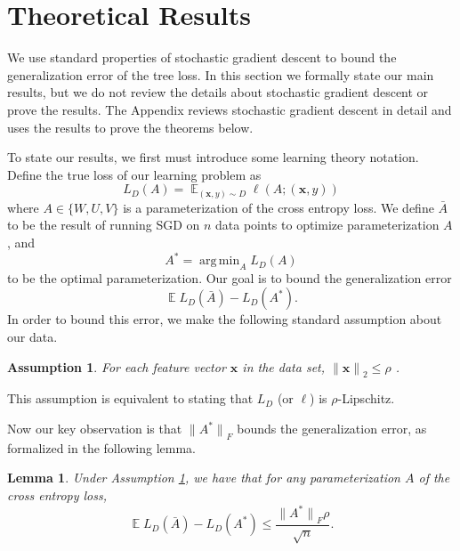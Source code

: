 \documentclass[twoside]{article}
\newtheorem{assumption}{Assumption}
\newtheorem{lemma}{Lemma}
\DeclareMathOperator{\E}{\mathbb E}
\DeclareMathOperator*{\argmin}{arg\,min}
\renewcommand{\star}[1]{{#1}^{*}}
\newcommand{\x}{\mathbf x}
\newcommand{\ltwo}[1]{{\lVert {#1} \rVert}_2}
\newcommand{\lF}[1]{{\lVert {#1} \rVert}_F}
\begin{document}

\section{Theoretical Results}
\label{sec:theory}

We use standard properties of stochastic gradient descent to bound the generalization error of the tree loss.
In this section we formally state our main results,
but we do not review the details about stochastic gradient descent or prove the results.
The Appendix reviews stochastic gradient descent in detail and uses the results to prove the theorems below.

To state our results, we first must introduce some learning theory notation.
Define the true loss of our learning problem as
\begin{equation}
    L_D(A) = \E_{(\x,y)\sim D} \ell(A; (\x, y))
\end{equation}
where $A \in \{W, U, V\}$ is a parameterization of the cross entropy loss.
We define $\bar A$ to be the result of running SGD on $n$ data points to optimize parameterization $A$,
and 
\begin{equation}
    \star A = \argmin_{A} L_D(A)
\end{equation}
to be the optimal parameterization.
Our goal is to bound the generalization error
\begin{equation}
    \E L_D(\bar A) - L_D(\star A).
\end{equation}
In order to bound this error, we make the following standard assumption about our data.
\begin{assumption}
    \label{ass:lip}
    For each feature vector $\x$ in the data set, 
        $\ltwo{\x} \le \rho$
        .
\end{assumption}
This assumption is equivalent to stating that $L_D$ (or $\ell$) is $\rho$-Lipschitz.

Now our key observation is that $\lF{\star A}$ bounds the generalization error,
as formalized in the following lemma.
\begin{lemma}
    \label{ref:cor:A}
    Under Assumption \ref{ass:lip},
    we have that for any parameterization $A$ of the cross entropy loss,
    \begin{equation}
        \E L_D(\bar A) - L_D(\star A) \le \frac{\lF{\star A}\rho}{\sqrt n}.
        \label{eq:Aconv}
    \end{equation}
\end{lemma}
\end{document}

